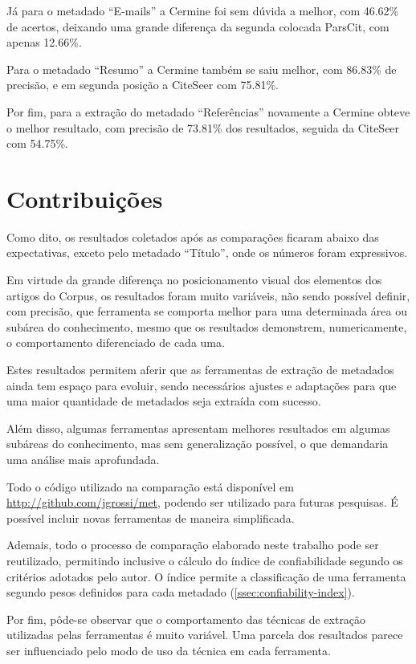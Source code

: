 Já para o metadado ``E-mails'' a Cermine foi sem dúvida a melhor, com 46.62\% de acertos, deixando uma grande diferença da segunda colocada ParsCit, com apenas 12.66\%.

Para o metadado ``Resumo'' a Cermine também se saiu melhor, com 86.83\% de precisão, e em segunda posição a CiteSeer com 75.81\%.

Por fim, para a extração do metadado ``Referências'' novamente a Cermine obteve o melhor resultado, com precisão de 73.81\% dos resultados, seguida da CiteSeer com 54.75\%.

\section{Contribuições}
\label{sec:contributions}

Como dito, os resultados coletados após as comparações ficaram abaixo das expectativas, exceto pelo metadado ``Título'', onde os números foram expressivos.

Em virtude da grande diferença no posicionamento visual dos elementos dos artigos do Corpus, os resultados foram muito variáveis, não sendo possível definir, com precisão, que ferramenta se comporta melhor para uma determinada área ou subárea do conhecimento, mesmo que os resultados demonstrem, numericamente, o comportamento diferenciado de cada uma.

Estes resultados permitem aferir que as ferramentas de extração de metadados ainda tem espaço para evoluir, sendo necessários ajustes e adaptações para que uma maior quantidade de metadados seja extraída com sucesso. 

Além disso, algumas ferramentas apresentam melhores resultados em algumas subáreas do conhecimento, mas sem generalização possível, o que demandaria uma análise mais aprofundada.

Todo o código utilizado na comparação está disponível em \url{http://github.com/jgrossi/met}, podendo ser utilizado para futuras pesquisas. É possível incluir novas ferramentas de maneira simplificada.

Ademais, todo o processo de comparação elaborado neste trabalho pode ser reutilizado, permitindo inclusive o cálculo do índice de confiabilidade segundo os critérios adotados pelo autor. O índice permite a classificação de uma ferramenta segundo pesos definidos para cada metadado (\autoref{ssec:confiability-index}).

Por fim, pôde-se observar que o comportamento das técnicas de extração utilizadas pelas ferramentas é muito variável. Uma parcela dos resultados parece ser influenciado pelo modo de uso da técnica em cada ferramenta.

